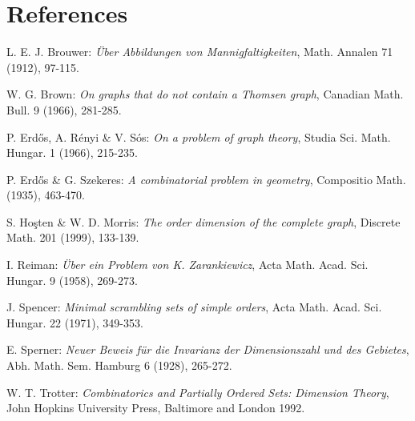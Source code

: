 \documentclass[10pt,twoside]{book}
\newcommand{\Font}[1]{\fontfamily{qhv}\selectfont #1}
\begin{document}
				\section*{\Font{References}}
				\begin{enumerate}[{[}1{]}]
				 \item L. E. J. Brouwer: \textit{Über Abbildungen von Mannigfaltigkeiten}, Math. Annalen 71 (1912), 97-115.
				
				 \item W. G. Brown: \textit{On graphs that do not contain a Thomsen graph}, Canadian Math. Bull. 9 (1966), 281-285.
				
				 \item P. Erdős, A. Rényi \& V. Sós: \textit{On a problem of graph theory}, Studia Sci. Math. Hungar. 1 (1966), 215-235.
				
				 \item P. Erdős \& G. Szekeres: \textit{A combinatorial problem in geometry}, Compositio Math. (1935), 463-470.
				
				 \item S. Hoşten \& W. D. Morris: \textit{The order dimension of the complete graph}, Discrete Math. 201 (1999), 133-139.
				
				 \item I. Reiman: \textit{Über ein Problem von K. Zarankiewicz}, Acta Math. Acad. Sci. Hungar. 9 (1958), 269-273.
				
				 \item J. Spencer: \textit{Minimal scrambling sets of simple orders}, Acta Math. Acad. Sci. Hungar. 22 (1971), 349-353.
				
				 \item E. Sperner: \textit{Neuer Beweis für die Invarianz der Dimensionszahl und des Gebietes}, Abh. Math. Sem. Hamburg 6 (1928), 265-272.
				
				 \item W. T. Trotter: \textit{Combinatorics and Partially Ordered Sets: Dimension Theory}, John Hopkins University Press, Baltimore and London 1992.
			\end{enumerate}
\end{document}
